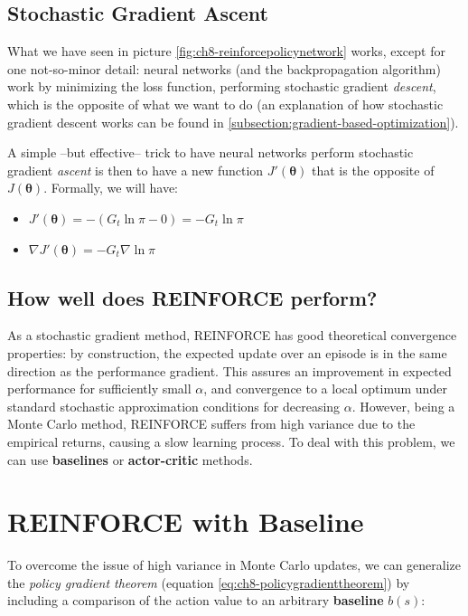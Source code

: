 \subsection{Stochastic Gradient Ascent}
What we have seen in picture \ref{fig:ch8-reinforcepolicynetwork} works, except for one not-so-minor detail: neural networks (and the backpropagation algorithm) work by minimizing the loss function, performing stochastic gradient \textit{descent}, which is the opposite of what we want to do (an explanation of how stochastic gradient descent works can be found in \autoref{subsection:gradient-based-optimization}).

A simple --but effective-- trick to have neural networks perform stochastic gradient \textit{ascent} is then to have a new function $J' (\boldsymbol{\theta})$ that is the opposite of $J(\boldsymbol{\theta})$. Formally, we will have:

\begin{itemize}
    \item $J' (\boldsymbol{\theta}) = -(G_t \ln{\pi} - 0) = -G_t \ln{\pi}$
    \item $\nabla J' (\boldsymbol{\theta}) = -G_t \nabla \ln{\pi}$
\end{itemize}

\subsection{How well does REINFORCE perform?}
As a stochastic gradient method, REINFORCE has good theoretical convergence properties: by construction, the expected update over an episode is in the same direction as the performance gradient. This assures an improvement in expected performance for sufficiently small $\alpha$, and convergence to a local optimum under standard stochastic approximation conditions for decreasing $\alpha$. However, being a Monte Carlo method, REINFORCE suffers from high variance due to the empirical returns, causing a slow learning process. To deal with this problem, we can use \textbf{baselines} or \textbf{actor-critic} methods.

\section{REINFORCE with Baseline}
To overcome the issue of high variance in Monte Carlo updates, we can generalize the \textit{policy gradient theorem} (equation \ref{eq:ch8-policygradienttheorem}) by including a comparison of the action value to an arbitrary \textbf{baseline} $b(s)$:

